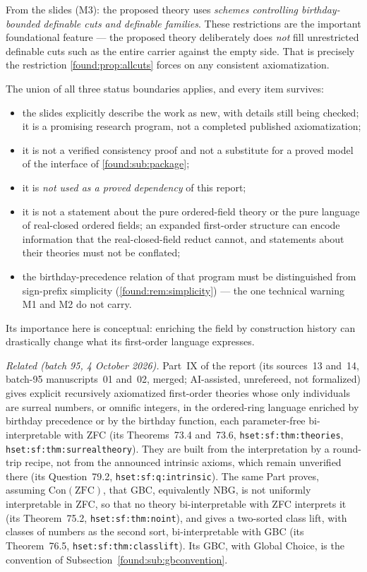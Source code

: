 \documentclass[11pt,letterpaper]{article}
\numberwithin{equation}{section}
\theoremstyle{definition}
\theoremstyle{remark}
\begin{document}
From the slides (M3): the proposed theory uses \emph{schemes controlling
birthday-bounded definable cuts and definable families}. These restrictions are
the important foundational feature --- the proposed theory deliberately does
\emph{not} fill unrestricted definable cuts such as the entire carrier against
the empty side. That is precisely the restriction \cref{found:prop:allcuts}
forces on any consistent axiomatization.

The union of all three status boundaries applies, and every item survives:
\begin{itemize}
\item the slides explicitly describe the work as new, with details still being
checked; it is a promising research program, not a completed published
axiomatization;
\item it is not a verified consistency proof and not a substitute for a proved
model of the interface of \cref{found:sub:package};
\item it is \emph{not used as a proved dependency} of this report;
\item it is not a statement about the pure ordered-field theory or the pure
language of real-closed ordered fields; an expanded first-order structure can
encode information that the real-closed-field reduct cannot, and statements
about their theories must not be conflated;
\item the birthday-precedence relation of that program must be distinguished
from sign-prefix simplicity (\cref{found:rem:simplicity}) --- the one technical
warning M1 and M2 do not carry.
\end{itemize}
Its importance here is conceptual: enriching the field by construction history
can drastically change what its first-order language expresses.

\emph{Related (batch 95, 4 October 2026).} Part~IX of the report
(its sources~13 and~14, batch-95 manuscripts~01 and~02, merged; AI-assisted,
unrefereed, not formalized) gives explicit recursively axiomatized first-order
theories whose only individuals are surreal numbers, or omnific integers, in
the ordered-ring language enriched by birthday precedence or by the birthday
function, each parameter-free bi-interpretable with ZFC (its Theorems~73.4
and~73.6, \texttt{hset:sf:thm:theories}, \texttt{hset:sf:thm:surrealtheory}).
They are built from the interpretation by a round-trip recipe, not from the
announced intrinsic axioms, which remain unverified there (its Question~79.2,
\texttt{hset:sf:q:intrinsic}). The same Part proves, assuming
$\mathrm{Con}(\mathrm{ZFC})$, that GBC, equivalently NBG, is not uniformly
interpretable in ZFC, so that no theory bi-interpretable with ZFC interprets
it (its Theorem~75.2, \texttt{hset:sf:thm:noint}), and gives a two-sorted class
lift, with classes of numbers as the second sort, bi-interpretable with GBC
(its Theorem~76.5, \texttt{hset:sf:thm:classlift}). Its GBC, with Global Choice,
is the convention of Subsection~\ref{found:sub:gbconvention}.
\end{document}
